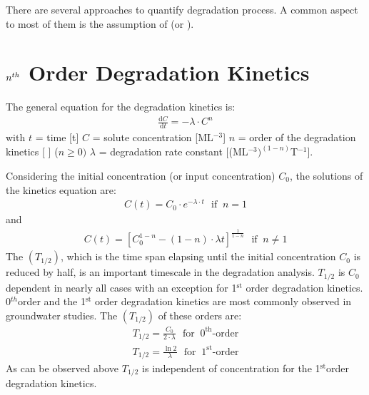 \documentclass[letterpaper,10pt,english]{jupyterBook}
\begin{document}
\sphinxAtStartPar
There are several approaches to quantify degradation process.
A common aspect to most of them is the assumption of  (or  ).


\section{\protect\(n^{th}\protect\) \sphinxhyphen{} Order Degradation Kinetics}
\label{\detokenize{content/transport/L10/22_reactive_transport:n-th-order-degradation-kinetics}}
\sphinxAtStartPar
The general equation for the degradation kinetics is:
\begin{equation*}
\begin{split}
\frac{\text{d}C}{\text{d} t} = - \lambda \cdot C^n
\end{split}
\end{equation*}
\sphinxAtStartPar
with \(t\) = time {[}t{]} 
\(C\) = solute concentration {[}ML\(^{-3}\){]} 
\(n\) = order of the degradation kinetics {[} \sphinxhyphen{} {]} (\(n\geq 0)\) 
\(\lambda\) = degradation rate constant {[}(ML\(^{-3})^{(1-n)}\)T\(^{-1}\){]}.

\sphinxAtStartPar
Considering the initial concentration (or input concentration) \(C_0\), the solutions of the kinetics equation are:
\begin{equation*}
\begin{split}
C(t) = C_0\cdot e^{-\lambda \cdot t} \: \: \: \text{if }\: n = 1  
\end{split}
\end{equation*}
\sphinxAtStartPar
and
\begin{equation*}
\begin{split}
C(t) = [C_0^{1-n} - (1-n)\cdot \lambda t]^{\frac{1}{1-n}} \:\:\: \text{if }\: n\neq 1 
\end{split}
\end{equation*}
\sphinxAtStartPar
The  \((T_{1/2})\), which is the time span elapsing until the initial concentration \(C_0\) is reduced by half, is an important time\sphinxhyphen{}scale in the degradation analysis. \(T_{1/2}\) is \(C_0\) dependent in nearly all cases with an exception for 1\(^\text{st}\)\sphinxhyphen{} order degradation kinetics. 0\(^{th}\)\sphinxhyphen{}order and the 1\(^\text{st}\)\sphinxhyphen{} order degradation kinetics are most commonly observed in groundwater studies. The \((T_{1/2})\) of these orders are:
\begin{equation*}
\begin{split}
T_{1/2} = \frac{C_0}{2\cdot \lambda} \:\:\: \text{for } \:0^{\text{th}}\text{-order}   
\end{split}
\end{equation*}\begin{equation*}
\begin{split}
T_{1/2} = \frac{\ln 2}{\lambda} \:\:\: \text{for } \:1^{\text{st}}\text{-order}   
\end{split}
\end{equation*}
\sphinxAtStartPar
As can be observed above \(T_{1/2}\) is independent of concentration for the 1\(^{\text{st}}\)\sphinxhyphen{}order degradation kinetics.
\end{document}

